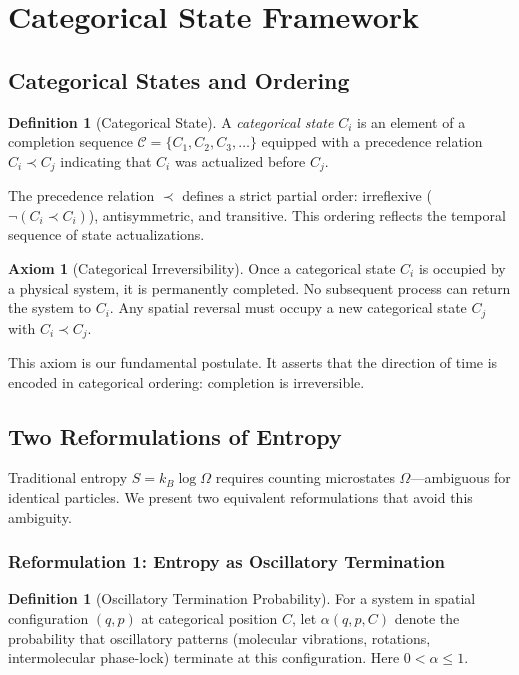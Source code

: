 \documentclass[superscriptaddress,prb,10pt]{revtex4-2}
\theoremstyle{definition}
\newtheorem{definition}[theorem]{Definition}
\newtheorem{axiom}[theorem]{Axiom}
\theoremstyle{remark}
\begin{document}
\section{Categorical State Framework}

\subsection{Categorical States and Ordering}

\begin{definition}[Categorical State]
A \emph{categorical state} $C_i$ is an element of a completion sequence $\mathcal{C} = \{C_1, C_2, C_3, \ldots\}$ equipped with a precedence relation $C_i \prec C_j$ indicating that $C_i$ was actualized before $C_j$.
\end{definition}

The precedence relation $\prec$ defines a strict partial order: irreflexive ($\neg(C_i \prec C_i)$), antisymmetric, and transitive. This ordering reflects the temporal sequence of state actualizations.

\begin{axiom}[Categorical Irreversibility]
\label{ax:irreversibility}
Once a categorical state $C_i$ is occupied by a physical system, it is permanently completed. No subsequent process can return the system to $C_i$. Any spatial reversal must occupy a new categorical state $C_j$ with $C_i \prec C_j$.
\end{axiom}

This axiom is our fundamental postulate. It asserts that the direction of time is encoded in categorical ordering: completion is irreversible.

\subsection{Two Reformulations of Entropy}

Traditional entropy $S = k_B \log \Omega$ requires counting microstates $\Omega$—ambiguous for identical particles. We present two equivalent reformulations that avoid this ambiguity.

\subsubsection{Reformulation 1: Entropy as Oscillatory Termination}

\begin{definition}[Oscillatory Termination Probability]
\label{def:alpha}
For a system in spatial configuration $(q,p)$ at categorical position $C$, let $\alpha(q,p,C)$ denote the probability that oscillatory patterns (molecular vibrations, rotations, intermolecular phase-lock) terminate at this configuration. Here $0 < \alpha \leq 1$.
\end{definition}
\end{document}
